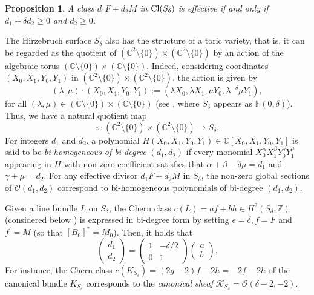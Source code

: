 \documentclass{amsart} %
\newtheorem{proposition}[theorem]{Proposition}
\theoremstyle{definition}
\newcommand{\cs}{S_{\delta}}
\newcommand{\mcO}{\mathcal{O}}
\newcommand{\mcK}{\mathcal{K}}
\begin{document}
\begin{proposition}\label{effective}
 A class $ d_1 F + d_2 M $ in ${\rm Cl}(S_{\delta})$ is effective if and only if
 $d_1+\delta d_2 \geq 0$ and $d_2 \geq 0$.
\end{proposition}
The Hirzebruch surface $S_{\delta}$  also has the structure of a toric variety,
that is, it can be regarded as the quotient of
$(\mathbb{C}^2\setminus \{0\})\times (\mathbb{C}^2\setminus \{0\})$ by an action of the algebraic torus
$(\mathbb{C}\setminus \{0\})\times (\mathbb{C}\setminus \{0\})$. Indeed, considering coordinates
$(X_0,X_1,Y_0,Y_1)$ in $(\mathbb{C}^2\setminus \{0\})\times (\mathbb{C}^2\setminus \{0\})$, the action is
given by
\[
(\lambda,\mu)\cdot (X_0,X_1,Y_0,Y_1):=(\lambda X_0,\lambda X_1,\mu Y_0,\lambda^{-\delta}\mu Y_1),
\]
for all $(\lambda,\mu)\in (\mathbb{C}\setminus \{0\})\times (\mathbb{C}\setminus \{0\})$ (see \cite{Correa},
where $ S_{\delta} $ appears as $ \mathbb{F}(0, \delta) $).
 Thus, we have a natural quotient map
 \begin{equation}\label{quotmap}
    \pi: (\mathbb{C}^2\setminus \{0\})\times (\mathbb{C}^2\setminus \{0\})\rightarrow S_{\delta}.
 \end{equation}
For integers $d_1$ and $d_2$,
a polynomial $H(X_0,X_1,Y_0,Y_1)\in \mathbb{C}[X_0,X_1,Y_0,Y_1]$ is said to be
\emph{bi-homogeneous of bi-degree} $(d_1,d_2)$ if
every monomial $X_0^\alpha X_1^\beta Y_0^\gamma Y_1^\mu$ appearing in $H$ with non-zero coefficient satisfies
that $\alpha+\beta-\delta\mu=d_1$ and $\gamma+\mu=d_2$. For any effective divisor $ d_1 F + d_2 M $ in $S_{\delta}$,
the non-zero global sections of $\mcO(d_1,d_2)$ correspond to bi-homogeneous polynomials of bi-degree
$(d_1,d_2)$.

Given a line bundle $ L $ on $S_{\delta}$, the Chern class
$ c( L ) = a f + b h \in H^2( S_{\delta}, \mathbb{Z} ) $ (considered below
\cite[Definition 1.1]{Gomez-Mont}) is expressed in bi-degree
form by setting $ e = \delta, f = F $ and $ f^{\prime} = M $ (so that $ [B_0]^* = M_0 $).
Then, it holds that
\begin{equation}\label{CoC}
 \left(
  \begin{matrix}
    d_1  \\
    d_2
  \end{matrix} \right) =
 \left(
  \begin{matrix}
    1 & -\delta/2  \\
    0 & 1
  \end{matrix} \right)
 \left(
  \begin{matrix}
      a  \\
      b
  \end{matrix} \right).
\end{equation}
For instance, the Chern class $ c( K_{\cs} ) = (2g-2) f -2 h = -2f -2h $ of the canonical
bundle $ K_{\cs} $ \cite[Lemma 1.3]{Gomez-Mont} corresponds to the
\textit{canonical sheaf} $ \mcK_{\cs} = \mcO(\delta-2,-2) $.
\end{document}
